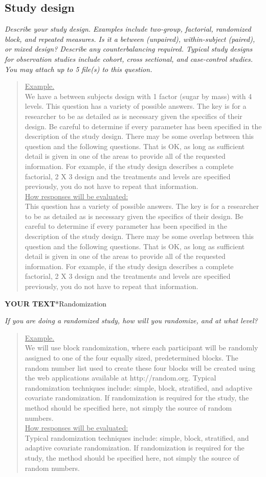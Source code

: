 \documentclass{article}
\newcommand{\example}[2]{\vspace{-0.3cm}\begin{quote}\underline{Example.}\\#1\ifx#2\undefined \else \\[0.2cm]\underline{How responses will be evaluated:}\\#2\fi\\\end{quote}}
\newcommand{\yourtext}[1]{\noindent\textbf{\color{red}YOUR TEXT}}
\begin{document}
	\subsection*{Study design}
	
	\ifx\hidehints\undefined
	
	\textit{%
		Describe your study design. Examples include two-group, factorial, randomized block, and repeated measures. Is it a between (unpaired), within-subject (paired), or mixed design? Describe any counterbalancing required. Typical study designs for observation studies include cohort, cross sectional, and case-control studies.\\
		You may attach up to 5 file(s) to this question.
	}\\
	
	\example{
		We have a between subjects design with 1 factor (sugar by mass) with 4 levels. }{		
		This question has a variety of possible answers. The key is for a researcher to be as detailed as is necessary given the specifics of their design. Be careful to determine if every parameter has been specified in the description of the study design. There may be some overlap between this question and the following questions. That is OK, as long as sufficient detail is given in one of the areas to provide all of the requested information. For example, if the study design describes a complete factorial, 2 X 3 design and the treatments and levels are specified previously, you do not have to repeat that information.
	}
	\fi
	
	\yourtext
	
	\subsection*{Randomization}
	
	\ifx\hidehints\undefined
	
	\textit{%
		If you are doing a randomized study, how will you randomize, and at what level? 
	}\\
	
	\example{
		We will use block randomization, where each participant will be randomly assigned to one of the four equally sized, predetermined blocks. The random number list used to create these four blocks will be created using the web applications available at http://random.org.
		}{Typical randomization techniques include: simple, block, stratified, and adaptive covariate randomization. If randomization is required for the study, the method should be specified here, not simply the source of random numbers.}
	\fi
	
\end{document}
